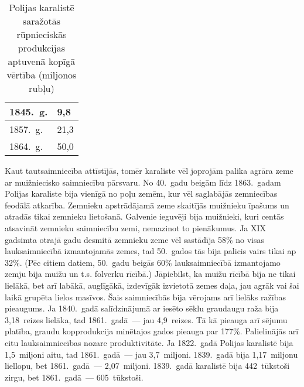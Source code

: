 \documentclass[twoside,a5paper,12pt,fleqn,openany]{extbook}
\begin{document}

\noindent
\begin{table}[h!]
\caption{Polijas karalistē saražotās rūpnieciskās produkcijas aptuvenā kopīgā vērtība (miljonos rubļu)} \label{tab:table2}
\begin{tabularx}{\linewidth}{|p{4cm}|p{4cm}|}
\hline
1845.~g. & 9,8 \\
\hline
1857.~g. & 21,3 \\
\hline
1864.~g. & 50,0 \\
\hline
\end{tabularx}
\end{table}



Kaut tautsaimniecība attīstījās, tomēr karaliste vēl joprojām palika agrāra zeme ar muižniecisko saimniecību pārsvaru. No 40.~gadu beigām līdz 1863.~gadam Polijas karaliste bija vienīgā no poļu zemēm, kur vēl saglabājās zemniecības feodālā atkarība. Zemnieku apstrādājamā zeme skaitījās muižnieku īpašums un atradās tikai zemnieku lietošanā. Galvenie ieguvēji bija muižnieki, kuri centās atsavināt zemnieku saimniecību zemi, nemazinot to pienākumus. Ja XIX gadsimta otrajā gadu desmitā zemnieku zeme vēl sastādīja 58\% no visas lauksaimniecībā izmantojamās zemes, tad 50.~gados tās bija palicis vairs tikai ap 32\%. (Pēc citiem datiem, 50.~gadu beigās 60\% lauksaimniecībā izmantojamo zemju bija muižu un t.s. folverku rīcībā.) Jāpiebilst, ka muižu rīcībā bija ne tikai lielākā, bet arī labākā, auglīgākā, izdevīgāk izvietotā zemes daļa, jau agrāk vai šai laikā grupēta lielos masīvos. Šais saimniecībās bija vērojams arī lielāks ražības pieaugums. Ja 1840.~gadā salīdzinājumā ar iesēto sēklu graudaugu raža bija 3,18~reizes lielāka, tad 1861.~gadā~--- jau 4,9~reizes. Tā kā pieauga arī sējumu platība, graudu kopprodukcija minētajos gados pieauga par 177\%. Palielinājās arī citu lauksaimniecības nozare produktivitāte. Ja 1822.~gadā Polijas karalistē bija 1,5~miljoni aitu, tad 1861.~gadā~--- jau 3,7~miljoni. 1839.~gadā bija 1,17~miljonu liellopu, bet 1861.~gadā~--- 2,07~miljoni. 1839.~gadā karalistē bija 442~tūkstoši zirgu, bet 1861.~gadā~--- 605~tūkstoši.
\end{document}

